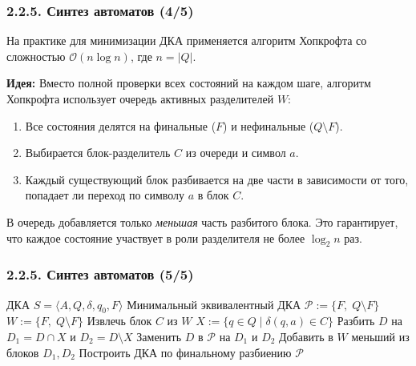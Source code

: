 \documentclass[mathserif,12pt,aspectratio=169]{beamer}
\def\NB#1{{\bf\color{brown}#1}}
\let\emptyset\varnothing
\def\Assign{\operatorname{:=}}
\begin{document}
\begin{frame}
\frametitle{2.2.5. Синтез автоматов (4/5)}

На практике для минимизации ДКА применяется алгоритм Хопкрофта 
со сложностью $\mathcal{O}(n \log n)$, где $n = |Q|$.

\medskip
\NB{Идея:}
Вместо полной проверки всех состояний на каждом шаге, 
алгоритм Хопкрофта использует очередь активных разделителей $W$:

\begin{enumerate}
    \item Все состояния делятся на финальные ($F$) и нефинальные ($Q \setminus F$).
    \item Выбирается блок-разделитель $C$ из очереди и символ $a$. 
    \item Каждый существующий блок разбивается на две части в 
    зависимости от того, попадает ли переход по символу $a$ в блок $C$.
\end{enumerate}

\medskip
\begin{remark}
В очередь добавляется только \emph{меньшая} часть разбитого блока. 
Это гарантирует, что каждое состояние участвует в роли разделителя  
не более $\log_2 n$ раз.
\end{remark}
\end{frame}

\begin{frame}
\frametitle{2.2.5. Синтез автоматов (5/5)}

\begin{algorithmic}
\REQUIRE ДКА $S=\langle A, Q, \delta, q_0, F\rangle$
\ENSURE Минимальный эквивалентный ДКА
\STATE $\mathcal{P} \Assign \{F,\;Q\setminus F\}$ 
\STATE $W \Assign \{F,\;Q\setminus F\}$ 
\WHILE{$W \neq \emptyset$}
    \STATE Извлечь блок $C$ из $W$
        \STATE $X \Assign \{q \in Q \mid \delta(q, a) \in C\}$ 
        \FORALL{$D \in \mathcal{P} : (D \cap X \neq \emptyset) \wedge (D \setminus X \neq \emptyset)$}
            \STATE Разбить $D$ на $D_1 = D \cap X$ и $D_2 = D \setminus X$
            \STATE Заменить $D$ в $\mathcal{P}$ на $D_1$ и $D_2$
            \STATE Добавить в $W$ меньший из блоков $D_1, D_2$ 
        \ENDFOR
    \ENDFOR
\ENDWHILE
\STATE Построить ДКА по финальному разбиению $\mathcal{P}$
\end{algorithmic}

\end{frame}
\end{document}
